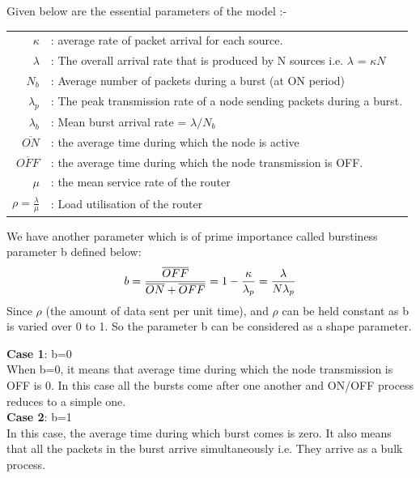 Given below are the essential parameters of the model :-\\

 \begin{tabular}{rl}
$\kappa$ &:  average rate of packet arrival for each source.\\
$\lambda$ &: The overall arrival rate that is produced by N sources i.e. $\lambda$ =  ${\kappa}N$\\
$N_{b}$ &: Average number of packets during a burst (at ON period)\\
${\lambda}_p$ &:  The peak transmission rate of a node sending packets during a burst. \\
${\lambda}_b$ &: Mean burst arrival rate = $\lambda/N_{b}$\\
$\overline{ON}$ &: the average time during which the node is active\\
$\overline{OFF}$ &: the average time during which the node transmission is OFF.\\
$\mu$ & : the mean service rate of the router\\
$\rho = \frac{\lambda}{\mu}$ &: Load utilisation of the router \\
 \end{tabular}


We have another parameter which is of prime importance called burstiness parameter b defined below:\\

\begin{equation}
b = \frac{\overline{OFF}}{\overline{ON} + \overline{OFF}} = 1 - \frac{\kappa}{{\lambda}_p} = \frac{\lambda}{N{\lambda}_p}\\
\end{equation}
Since $\rho$ (the amount of data sent per unit time), and $\rho$ can be held constant as b is varied over 0 to 1. So the parameter b can be considered as a shape parameter.

\textbf{Case 1}: b=0 \\
When b=0, it means that average time during which the node transmission is OFF is 0. In this case all the bursts come after one another and ON/OFF process reduces to a simple one.\\

\textbf{Case 2}: b=1\\
In this case, the average time during which burst comes is zero. It also means that all the packets in the burst arrive simultaneously i.e. They arrive as a bulk process.\\ 


